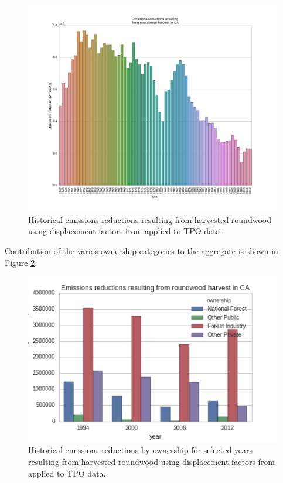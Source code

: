 \documentclass[a4paper]{article}
\begin{document}
\begin{figure}[htb]
\centering
\includegraphics[width=\textwidth]{./graphics/ann_hh_em_reduc.pdf}
\caption{Historical emissions reductions resulting from harvested roundwood using displacement factors from \citep{Sathre2010} applied to TPO data.\label{em_reduc_hist}}
\end{figure}

Contribution of the varios ownership categories to the aggregate is
shown in Figure \ref{em_reduc_own}.

\begin{figure}[htb]
\centering
\includegraphics[width=.9\linewidth]{./graphics/harv_em_reductions.png}
\caption{\label{fig:orgparagraph1}
Historical emissions reductions by ownership for selected years resulting from harvested roundwood using displacement factors from \citep{Sathre2010} applied to TPO data. \label{em_reduc_own}}
\end{figure}
\end{document}
